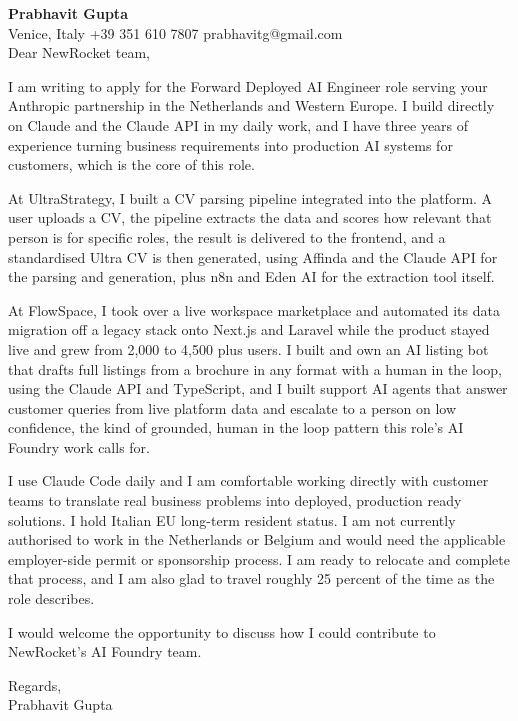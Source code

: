 \documentclass[a4paper,10.5pt]{article}
\begin{document}
\textbf{Prabhavit Gupta}\\
Venice, Italy \textbar{} +39 351 610 7807 \textbar{} prabhavitg@gmail.com\\[10pt]
Dear NewRocket team,

I am writing to apply for the Forward Deployed AI Engineer role serving your Anthropic partnership in the Netherlands and Western Europe. I build directly on Claude and the Claude API in my daily work, and I have three years of experience turning business requirements into production AI systems for customers, which is the core of this role.

At UltraStrategy, I built a CV parsing pipeline integrated into the platform. A user uploads a CV, the pipeline extracts the data and scores how relevant that person is for specific roles, the result is delivered to the frontend, and a standardised Ultra CV is then generated, using Affinda and the Claude API for the parsing and generation, plus n8n and Eden AI for the extraction tool itself.

At FlowSpace, I took over a live workspace marketplace and automated its data migration off a legacy stack onto Next.js and Laravel while the product stayed live and grew from 2,000 to 4,500 plus users. I built and own an AI listing bot that drafts full listings from a brochure in any format with a human in the loop, using the Claude API and TypeScript, and I built support AI agents that answer customer queries from live platform data and escalate to a person on low confidence, the kind of grounded, human in the loop pattern this role's AI Foundry work calls for.

I use Claude Code daily and I am comfortable working directly with customer teams to translate real business problems into deployed, production ready solutions. I hold Italian EU long-term resident status. I am not currently authorised to work in the Netherlands or Belgium and would need the applicable employer-side permit or sponsorship process. I am ready to relocate and complete that process, and I am also glad to travel roughly 25 percent of the time as the role describes.

I would welcome the opportunity to discuss how I could contribute to NewRocket's AI Foundry team.

Regards,\\
Prabhavit Gupta
\end{document}

